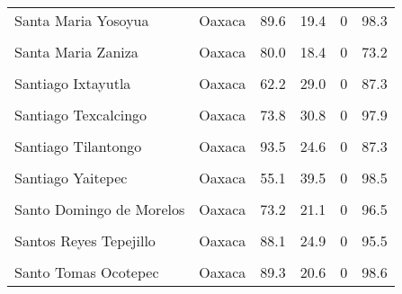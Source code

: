 \documentclass[
]{report}
\begin{document}
\begin{longtable}[t]{llrrrr}
Santa Maria Yosoyua & Oaxaca & 89.6 & 19.4 & 0 & 98.3\\
\cellcolor{gray!6}{Santa Maria Yucuhiti} & \cellcolor{gray!6}{Oaxaca} & \cellcolor{gray!6}{95.5} & \cellcolor{gray!6}{14.5} & \cellcolor{gray!6}{0} & \cellcolor{gray!6}{99.4}\\
\addlinespace
Santa Maria Zaniza & Oaxaca & 80.0 & 18.4 & 0 & 73.2\\
\cellcolor{gray!6}{Santiago Amoltepec} & \cellcolor{gray!6}{Oaxaca} & \cellcolor{gray!6}{73.6} & \cellcolor{gray!6}{21.9} & \cellcolor{gray!6}{0} & \cellcolor{gray!6}{93.7}\\
Santiago Ixtayutla & Oaxaca & 62.2 & 29.0 & 0 & 87.3\\
\cellcolor{gray!6}{Santiago Nuyoo} & \cellcolor{gray!6}{Oaxaca} & \cellcolor{gray!6}{98.1} & \cellcolor{gray!6}{24.1} & \cellcolor{gray!6}{0} & \cellcolor{gray!6}{99.4}\\
Santiago Texcalcingo & Oaxaca & 73.8 & 30.8 & 0 & 97.9\\
\addlinespace
\cellcolor{gray!6}{Santiago Textitlan} & \cellcolor{gray!6}{Oaxaca} & \cellcolor{gray!6}{88.9} & \cellcolor{gray!6}{13.0} & \cellcolor{gray!6}{0} & \cellcolor{gray!6}{61.7}\\
Santiago Tilantongo & Oaxaca & 93.5 & 24.6 & 0 & 87.3\\
\cellcolor{gray!6}{Santiago Tlazoyaltepec} & \cellcolor{gray!6}{Oaxaca} & \cellcolor{gray!6}{78.6} & \cellcolor{gray!6}{13.9} & \cellcolor{gray!6}{0} & \cellcolor{gray!6}{99.0}\\
Santiago Yaitepec & Oaxaca & 55.1 & 39.5 & 0 & 98.5\\
\cellcolor{gray!6}{Santiago Zacatepec} & \cellcolor{gray!6}{Oaxaca} & \cellcolor{gray!6}{59.7} & \cellcolor{gray!6}{34.8} & \cellcolor{gray!6}{0} & \cellcolor{gray!6}{99.4}\\
\addlinespace
Santo Domingo de Morelos & Oaxaca & 73.2 & 21.1 & 0 & 96.5\\
\cellcolor{gray!6}{Santo Domingo Tepuxtepec} & \cellcolor{gray!6}{Oaxaca} & \cellcolor{gray!6}{70.9} & \cellcolor{gray!6}{23.1} & \cellcolor{gray!6}{0} & \cellcolor{gray!6}{98.9}\\
Santos Reyes Tepejillo & Oaxaca & 88.1 & 24.9 & 0 & 95.5\\
\cellcolor{gray!6}{Santos Reyes Yucuna} & \cellcolor{gray!6}{Oaxaca} & \cellcolor{gray!6}{68.0} & \cellcolor{gray!6}{12.4} & \cellcolor{gray!6}{0} & \cellcolor{gray!6}{98.6}\\
Santo Tomas Ocotepec & Oaxaca & 89.3 & 20.6 & 0 & 98.6\\

\end{longtable}
\end{document}
